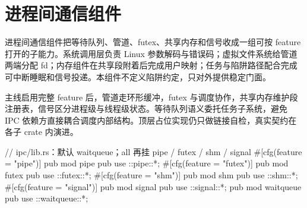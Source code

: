 
\section{进程间通信组件}

进程间通信组件把等待队列、管道、futex、共享内存和信号收成一组可按 feature 打开的子能力。系统调用层负责 Linux 参数解码与错误码；虚拟文件系统给管道两端分配 fd；内存组件在共享段附着后完成用户映射；任务与陷阱路径配合完成可中断睡眠和信号投递。本组件不定义陷阱约定，只对外提供稳定门面。

主线启用完整 feature 后，管道走环形缓冲，futex 与调度协作，共享内存维护段注册表，信号区分进程级与线程级状态。等待队列语义委托任务子系统，避免 IPC 依赖方直接耦合调度内部结构。顶层占位实现仍只做链接自检，真实契约在各子 crate 内演进。

\begin{rustcode}
// ipc/lib.rs：默认 waitqueue；all 再挂 pipe / futex / shm / signal
#[cfg(feature = "pipe")]
pub mod pipe { pub use ::pipe::*; }
#[cfg(feature = "futex")]
pub mod futex { pub use ::futex::*; }
#[cfg(feature = "shm")]
pub mod shm { pub use ::shm::*; }
#[cfg(feature = "signal")]
pub mod signal { pub use ::signal::*; }
pub mod waitqueue { pub use ::waitqueue::*; }
\end{rustcode}
